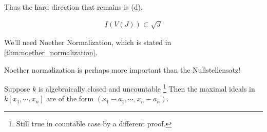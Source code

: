 Thus the hard direction that remains is (d),

\begin{align*}
I(V(J)) \subset \sqrt{J}
\end{align*}

We'll need Noether Normalization, which is stated in
\cref{thm:noether_normalization}.

\begin{warnings}

Noether normalization is perhaps more important than the
Nullstellensatz!

\end{warnings}

\begin{theorem}

Suppose \(k\) is algebraically closed and uncountable \footnote{Still
  true in countable case by a different proof.} Then the maximal ideals
in \(k[x_1, \cdots, x_n]\) are of the form
\((x_1 - a_1, \cdots, x_n - a_n)\).

\end{theorem}

